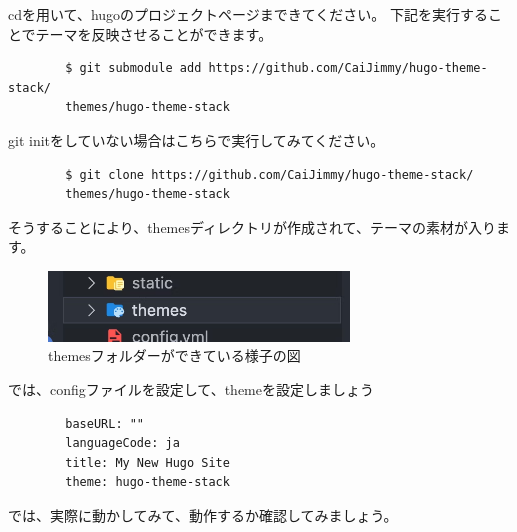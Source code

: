     cdを用いて、hugoのプロジェクトページまできてください。
    下記を実行することでテーマを反映させることができます。

    \begin{shaded}
      \begin{verbatim}
        $ git submodule add https://github.com/CaiJimmy/hugo-theme-stack/
        themes/hugo-theme-stack
      \end{verbatim}  
    \end{shaded}

    git initをしていない場合はこちらで実行してみてください。

    \begin{shaded}
      \begin{verbatim}
        $ git clone https://github.com/CaiJimmy/hugo-theme-stack/
        themes/hugo-theme-stack
      \end{verbatim}  
    \end{shaded}
    
    そうすることにより、themesディレクトリが作成されて、テーマの素材が入ります。

    \begin{figure}[H]
      \centering
      \includegraphics[width=8cm]{./image/02-chap5/firetree-themes.png}
      \caption{themesフォルダーができている様子の図}
      \label{chap5-firetree-themes-image}
    \end{figure}

    では、configファイルを設定して、themeを設定しましょう

    \begin{tcolorbox}[breakable]
      \begin{verbatim}
        baseURL: ""
        languageCode: ja
        title: My New Hugo Site
        theme: hugo-theme-stack
      \end{verbatim}
    \end{tcolorbox}

    では、実際に動かしてみて、動作するか確認してみましょう。

